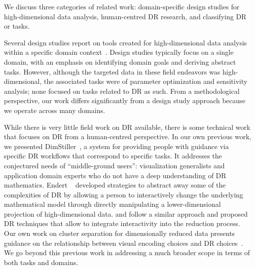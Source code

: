 
We discuss three categories of related work: domain-specific design studies for high-dimensional data analysis, human-centred \ac{DR} research, and classifying \ac{DR} or tasks. 

Several design studies report on tools created for high-dimensional data analysis within a specific domain context~\cite{Booshehrian2012,Piringer2010,Pretorius2011}. 
Design studies typically focus on a single domain, with an emphasis on identifying domain goals and deriving abstract tasks. 
However, although the targeted data in these field endeavors was high-dimensional, the associated tasks were of parameter optimization and sensitivity analysis; none focused on tasks related to \ac{DR} as such. From a methodological perspective, our work differs significantly from a design study approach because we operate across many domains.

While there is very little field work on \ac{DR} available, there is some technical work that focuses on \ac{DR} from a human-centred perspective. 
In our own previous work, we presented DimStiller~\cite{Ingram2010}, a system for providing people with guidance via specific \ac{DR} workflows that correspond to specific tasks. 
It addresses the conjectured needs of ``middle-ground users'': visualization generalists and application domain experts who do not have a deep understanding of \ac{DR} mathematics. 
Endert \etal~\cite{Endert2012,Endert2011} developed strategies to abstract away some of the complexities of \ac{DR} by allowing a person to interactively change the underlying mathematical model through directly manipulating a lower-dimensional projection of high-dimensional data. 
\citet{Joia2011} and \citet{Paulovich2011} follow a similar approach and proposed \ac{DR} techniques that allow to integrate interactivity into the reduction process. 
Our own work on cluster separation for dimensionally reduced data presents guidance on the relationship between visual encoding choices and \ac{DR} choices~\cite{Sedlmair2013}. 
We go beyond this previous work in addressing a much broader scope in terms of both tasks and domains. 

